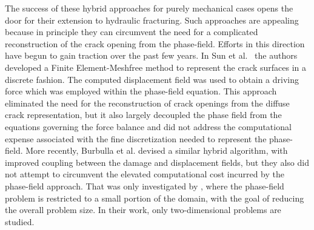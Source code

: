     The success of these hybrid approaches for purely mechanical cases opens the door for their extension to hydraulic fracturing.  Such approaches are appealing because in principle they can circumvent the need for a complicated reconstruction of the crack opening from the phase-field.  Efforts in this direction have begun to gain traction over the past few years. In Sun et al.\ \cite{sun2020hybrid} the authors developed a Finite Element-Meshfree method to represent the crack surfaces in a discrete fashion. The computed displacement field was used to obtain a driving force which was employed within the phase-field equation. This approach eliminated the need for the reconstruction of crack openings from the diffuse crack representation, but it also largely decoupled the phase field from the equations governing the force balance and did not address the computational expense associated with the fine discretization needed to represent the phase-field. More recently, Burbulla et al. \cite{burbulla2023modeling} devised a similar hybrid algorithm, with improved coupling between the damage and displacement fields, but they also did not attempt to circumvent the elevated computational cost incurred by the phase-field approach. That was only investigated by \cite{zhang2022hybrid}, where the phase-field problem is restricted to a small portion of the domain, with the goal of reducing the overall problem size. In their work, only two-dimensional problems are studied.